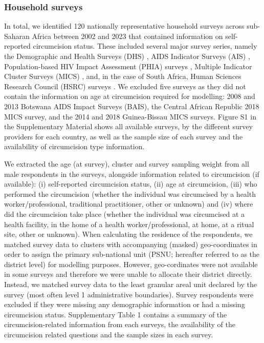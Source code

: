 \documentclass{article}
\begin{document}

\subsubsection*{Household surveys}


In total, we identified 120 nationally representative household surveys across sub-Saharan Africa between 2002 and 2023 that contained information on self-reported circumcision status. These included several major survey series, namely the Demographic and Health Surveys (DHS) \cite{dhs}, AIDS Indicator Surveys (AIS) \cite{ais}, Population-based HIV Impact Assessment (PHIA) surveys \cite{phia}, Multiple Indicator Cluster Surveys (MICS) \cite{mics}, and, in the case of South Africa, Human Sciences Research Council (HSRC) surveys \cite{hsrc}. We excluded five surveys as they did not contain the information on age at circumcision required for modelling: 2008 and 2013 Botswana AIDS Impact Surveys (BAIS), the Central African Republic 2018 MICS survey, and the 2014 and 2018 Guinea-Bissau MICS surveys. Figure S1 in the Supplementary Material shows all available surveys, by the different survey providers for each country, as well as the sample size of each survey and the availability of circumcision type information. 

We extracted the age (at survey), cluster and survey sampling weight from all male respondents in the surveys, alongside information related to circumcision (if available): (i) self-reported circumcision status, (ii) age at circumcision, (iii) who performed the circumcision (whether the individual was circumcised by a health worker/professional, traditional practitioner, other or unknown) and (iv) where did the circumcision take place (whether the individual was circumcised at a health facility, in the home of a health worker/professional, at home, at a ritual site, other or unknown). When calculating the residence of the respondents, we matched survey data to clusters with accompanying (masked) geo-coordinates in order to assign the primary sub-national unit (PSNU; hereafter referred to as the district level) for modelling purposes. However, geo-cordinates were not available in some surveys and therefore we were unable to allocate their district directly. Instead, we matched survey data to the least granular areal unit declared by the survey (most often level 1 administrative boundaries). Survey respondents were excluded if they were missing any demographic information or had a missing circumcision status. Supplementary Table 1 contains a summary of the circumcision-related information from each surveys, the availability of the circumcision related questions and the sample sizes in each survey.
\end{document}

